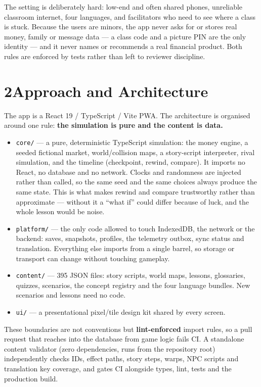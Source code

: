 \documentclass[10pt,a4paper]{article}
\begin{document}
The setting is deliberately hard: low-end and often shared phones, unreliable classroom internet, four languages, and facilitators who need to see where a class is stuck. Because the users are minors, the app never asks for or stores real money, family or message data --- a class code and a picture PIN are the only identity --- and it never names or recommends a real financial product. Both rules are enforced by tests rather than left to reviewer discipline.

\section*{2\quad Approach and Architecture}

The app is a React 19 / TypeScript / Vite PWA. The architecture is organised around one rule: \textbf{the simulation is pure and the content is data.}

\begin{itemize}
  \item \texttt{core/} --- a pure, deterministic TypeScript simulation: the money engine, a seeded fictional market, world\slash{}collision maps, a story-script interpreter, rival simulation, and the timeline (checkpoint, rewind, compare). It imports no React, no database and no network. Clocks and randomness are injected rather than called, so the same seed and the same choices always produce the same state. This is what makes rewind and compare trustworthy rather than approximate --- without it a ``what if'' could differ because of luck, and the whole lesson would be noise.
  \item \texttt{platform/} --- the only code allowed to touch IndexedDB, the network or the backend: saves, snapshots, profiles, the telemetry outbox, sync status and translation. Everything else imports from a single barrel, so storage or transport can change without touching gameplay.
  \item \texttt{content/} --- 395 JSON files: story scripts, world maps, lessons, glossaries, quizzes, scenarios, the concept registry and the four language bundles. New scenarios and lessons need no code.
  \item \texttt{ui/} --- a presentational pixel/tile design kit shared by every screen.
\end{itemize}

These boundaries are not conventions but \textbf{lint-enforced} import rules, so a pull request that reaches into the database from game logic fails CI. A standalone content validator (zero dependencies, runs from the repository root) independently checks IDs, effect paths, story steps, warps, NPC scripts and translation key coverage, and gates CI alongside types, lint, tests and the production build.
\end{document}
